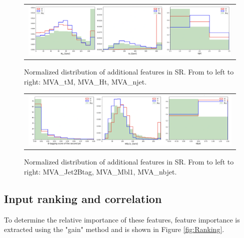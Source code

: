 \begin{figure}[tbh!]
 \begin{center}
 \begin{tabular}{c}
  \includegraphics[width=0.99\textwidth]{figures/Part3/BDT/Features4}\\
 \end{tabular}
 \caption{Normalized distribution of additional features in SR. From to left to right: MVA\_tM, MVA\_Ht, MVA\_njet.}
 \label{fig:Features4}
 \end{center}
\end{figure}

\begin{figure}[tbh!]
 \begin{center}
 \begin{tabular}{c}
  \includegraphics[width=0.99\textwidth]{figures/Part3/BDT/Features5}\\
 \end{tabular}
 \caption{Normalized distribution of additional features in SR. From to left to right: MVA\_Jet2Btag, MVA\_Mbl1, MVA\_nbjet.}
 \label{fig:Features5}
 \end{center}
\end{figure}

\subsection{Input ranking and correlation}
To determine the relative importance of these features, feature importance is extracted using the "gain" method and is shown in Figure \ref{fig:Ranking}.


